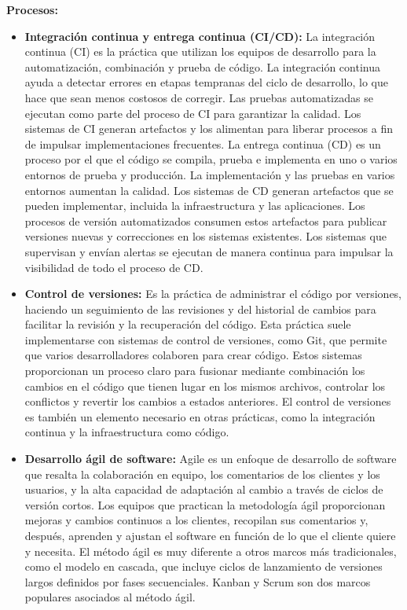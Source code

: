 \textbf{Procesos: }
\begin{itemize}
    \item \textbf{Integración continua y entrega continua (CI/CD): }La integración continua (CI) es la práctica que utilizan los equipos de desarrollo para la automatización, combinación y prueba de código. La integración continua ayuda a detectar errores en etapas tempranas del ciclo de desarrollo, lo que hace que sean menos costosos de corregir. Las pruebas automatizadas se ejecutan como parte del proceso de CI para garantizar la calidad. Los sistemas de CI generan artefactos y los alimentan para liberar procesos a fin de impulsar implementaciones frecuentes. La entrega continua (CD) es un proceso por el que el código se compila, prueba e implementa en uno o varios entornos de prueba y producción. La implementación y las pruebas en varios entornos aumentan la calidad. Los sistemas de CD generan artefactos que se pueden implementar, incluida la infraestructura y las aplicaciones. Los procesos de versión automatizados consumen estos artefactos para publicar versiones nuevas y correcciones en los sistemas existentes. Los sistemas que supervisan y envían alertas se ejecutan de manera continua para impulsar la visibilidad de todo el proceso de CD.
    \item \textbf{Control de versiones: }Es la práctica de administrar el código por versiones, haciendo un seguimiento de las revisiones y del historial de cambios para facilitar la revisión y la recuperación del código. Esta práctica suele implementarse con sistemas de control de versiones, como Git, que permite que varios desarrolladores colaboren para crear código. Estos sistemas proporcionan un proceso claro para fusionar mediante combinación los cambios en el código que tienen lugar en los mismos archivos, controlar los conflictos y revertir los cambios a estados anteriores. El control de versiones es también un elemento necesario en otras prácticas, como la integración continua y la infraestructura como código.
    \item \textbf{Desarrollo ágil de software: }Agile es un enfoque de desarrollo de software que resalta la colaboración en equipo, los comentarios de los clientes y los usuarios, y la alta capacidad de adaptación al cambio a través de ciclos de versión cortos. Los equipos que practican la metodología ágil proporcionan mejoras y cambios continuos a los clientes, recopilan sus comentarios y, después, aprenden y ajustan el software en función de lo que el cliente quiere y necesita. El método ágil es muy diferente a otros marcos más tradicionales, como el modelo en cascada, que incluye ciclos de lanzamiento de versiones largos definidos por fases secuenciales. Kanban y Scrum son dos marcos populares asociados al método ágil.

\end{itemize}
